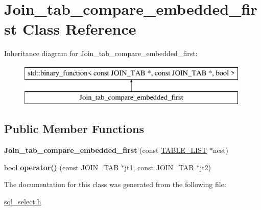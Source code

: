 \hypertarget{classJoin__tab__compare__embedded__first}{}\section{Join\+\_\+tab\+\_\+compare\+\_\+embedded\+\_\+first Class Reference}
\label{classJoin__tab__compare__embedded__first}
Inheritance diagram for Join\+\_\+tab\+\_\+compare\+\_\+embedded\+\_\+first\+:\begin{figure}[H]
\begin{center}
\leavevmode
\includegraphics[height=2.000000cm]{classJoin__tab__compare__embedded__first}
\end{center}
\end{figure}
\subsection*{Public Member Functions}
\begin{DoxyCompactItemize}
\item 
\mbox{\label{classJoin__tab__compare__embedded__first_a4aaf457499acd15e5398ca9d83730928}} 
{\bfseries Join\+\_\+tab\+\_\+compare\+\_\+embedded\+\_\+first} (const \mbox{\hyperlink{structTABLE__LIST}{T\+A\+B\+L\+E\+\_\+\+L\+I\+ST}} $\ast$nest)
\item 
\mbox{\label{classJoin__tab__compare__embedded__first_a73ca464f81e9822cdda5e23ec3b70a18}} 
bool {\bfseries operator()} (const \mbox{\hyperlink{classJOIN__TAB}{J\+O\+I\+N\+\_\+\+T\+AB}} $\ast$jt1, const \mbox{\hyperlink{classJOIN__TAB}{J\+O\+I\+N\+\_\+\+T\+AB}} $\ast$jt2)
\end{DoxyCompactItemize}


The documentation for this class was generated from the following file\+:\begin{DoxyCompactItemize}
\item 
\mbox{\hyperlink{sql__select_8h}{sql\+\_\+select.\+h}}\end{DoxyCompactItemize}
